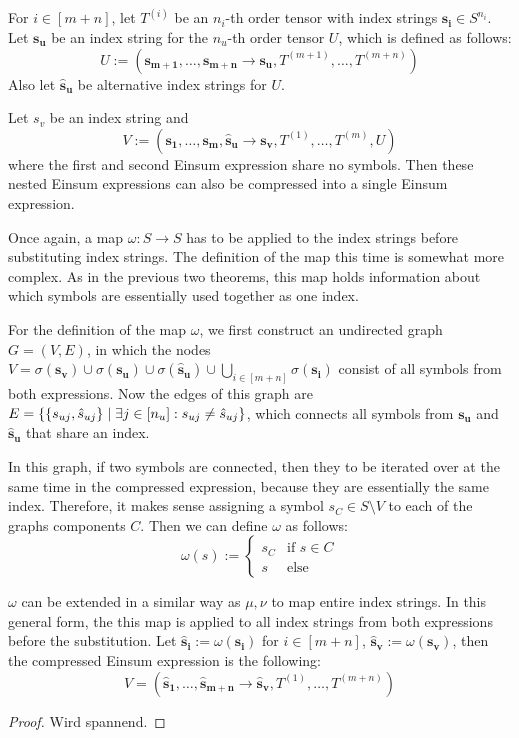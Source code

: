 \begin{theorem}
    \label{thm:nested_einsum:4}
    For $i \in [m + n]$, let $T^{(i)}$ be an $n_i$-th order tensor with index strings $\bm{s_i} \in S^{n_i}$.
    Let $\bm{s_u}$ be an index string for the $n_u$-th order tensor $U$, which is defined as follows:
    $$U := (\bm{s_{m + 1}},\dots,\bm{s_{m + n}} \rightarrow \bm{s_u}, T^{(m + 1)},\dots,T^{(m + n)})$$
    Also let $\bm{\hat{s}_u}$ be alternative index strings for $U$.

    Let $s_v$ be an index string and
    $$V := (\bm{s_1},\dots,\bm{s_m}, \bm{\hat{s}_u} \rightarrow \bm{s_v}, T^{(1)},\dots,T^{(m)}, U)$$
    where the first and second Einsum expression share no symbols.
    Then these nested Einsum expressions can also be compressed into a single Einsum expression.

    Once again, a map $\omega: S \rightarrow S$ has to be applied to the index strings before substituting index strings.
    The definition of the map this time is somewhat more complex.
    As in the previous two theorems, this map holds information about which symbols are essentially used together as one index.

    For the definition of the map $\omega$, we first construct an undirected graph $G = (V, E)$,
    in which the nodes $V = \sigma(\bm{s_v}) \cup \sigma(\bm{s_u}) \cup \sigma(\bm{\hat{s}_u}) \cup \bigcup_{i \in [m + n]} \sigma(\bm{s_i})$ consist of all symbols from both expressions.
    Now the edges of this graph are $E = \lbrace \lbrace s_{uj}, \hat{s}_{uj} \rbrace \mid \exists j \in [n_u]: s_{uj} \neq \hat{s}_{uj} \rbrace$,
    which connects all symbols from $\bm{s_u}$ and $\bm{\hat{s}_u}$ that share an index.

    In this graph, if two symbols are connected, then they to be iterated over at the same time in the compressed expression, because they are essentially the same index.
    Therefore, it makes sense assigning a symbol $s_C \in S \setminus V$ to each of the graphs components $C$.
    Then we can define $\omega$ as follows:
    $$\omega(s) := \begin{cases}
            s_C & \text{if } s \in C \\
            s   & \text{else}
        \end{cases}$$

    $\omega$ can be extended in a similar way as $\mu, \nu$ to map entire index strings.
    In this general form, the this map is applied to all index strings from both expressions before the substitution.
    Let $\bm{\hat{s}_i} := \omega(\bm{s_i})$ for $i \in [m + n]$, $\bm{\hat{s}_v} := \omega(\bm{s_v})$, then the compressed Einsum expression is the following:
    $$V = (\bm{\hat{s}_1}, \dots, \bm{\hat{s}_{m + n}} \rightarrow \bm{\hat{s}_v}, T^{(1)},\dots,T^{(m + n)})$$
\end{theorem}

\begin{proof}
    \small
    Wird spannend.
\end{proof}
